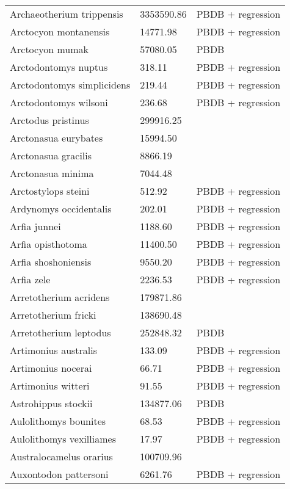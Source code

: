 \documentclass{article}
\begin{document}
\begin{center}
\begin{longtable}{p{} p{} p{}}
    Archaeotherium trippensis & 3353590.86 & PBDB + regression \\ 
    Arctocyon montanensis & 14771.98 & PBDB + regression \\ 
    Arctocyon mumak & 57080.05 & PBDB \\ 
    Arctodontomys nuptus & 318.11 & PBDB + regression \\ 
    Arctodontomys simplicidens & 219.44 & PBDB + regression \\ 
    Arctodontomys wilsoni & 236.68 & PBDB + regression \\ 
    Arctodus pristinus & 299916.25 & \cite{Smith2004} \\ 
    Arctonasua eurybates & 15994.50 & \cite{Tomiya2013} \\ 
    Arctonasua gracilis & 8866.19 & \cite{Tomiya2013} \\ 
    Arctonasua minima & 7044.48 & \cite{Tomiya2013} \\ 
    Arctostylops steini & 512.92 & PBDB + regression \\ 
    Ardynomys occidentalis & 202.01 & PBDB + regression \\ 
    Arfia junnei & 1188.60 & PBDB + regression \\ 
    Arfia opisthotoma & 11400.50 & PBDB + regression \\ 
    Arfia shoshoniensis & 9550.20 & PBDB + regression \\ 
    Arfia zele & 2236.53 & PBDB + regression \\ 
    Arretotherium acridens & 179871.86 & \cite{Tomiya2013} \\ 
    Arretotherium fricki & 138690.48 & \cite{Tomiya2013} \\ 
    Arretotherium leptodus & 252848.32 & PBDB \\ 
    Artimonius australis & 133.09 & PBDB + regression \\ 
    Artimonius nocerai & 66.71 & PBDB + regression \\ 
    Artimonius witteri & 91.55 & PBDB + regression \\ 
    Astrohippus stockii & 134877.06 & PBDB \\ 
    Aulolithomys bounites & 68.53 & PBDB + regression \\ 
    Aulolithomys vexilliames & 17.97 & PBDB + regression \\ 
    Australocamelus orarius & 100709.96 & \cite{Tomiya2013} \\ 
    Auxontodon pattersoni & 6261.76 & PBDB + regression \\ 

\end{longtable}
\end{center}
\end{document}
